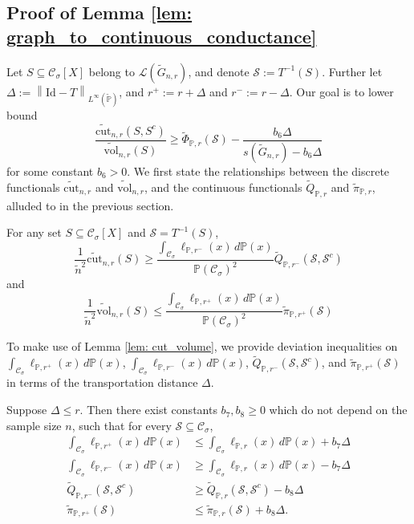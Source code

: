 \documentclass[11pt,twoside]{article}
\newcommand{\vol}{\mathrm{vol}}
\newcommand{\cut}{\mathrm{cut}}
\newcommand{\norm}[1]{\left\lVert#1\right\rVert}
\newcommand{\1}{\mathbbm{1}}
\newcommand{\Xbf}{X}
\newcommand{\Pbb}{\mathbb{P}}
\newcommand{\Sset}{\mathcal{S}}
\newcommand{\Cset}{\mathcal{C}}
\newcommand{\Csig}{\Cset_{\sigma}}
\begin{document}
\subsection{Proof of Lemma \ref{lem: graph_to_continuous_conductance}}
Let $S \subseteq \Csig[\Xbf]$ belong to $\mathcal{L}(\widetilde{G}_{n,r})$, and denote $\Sset := T^{-1}(S)$. Further let $\varDelta := \norm{\mathrm{Id} - T}_{L^{\infty}(\widetilde{\Pbb})}$, and $r^{+} := r + \varDelta$ and $r^{-} := r - \varDelta$. Our goal is to lower bound
\begin{equation*}
\frac{\widetilde{\cut}_{n,r}(S,S^c)}{\widetilde{\vol}_{n,r}(S)} \geq \widetilde{\Phi}_{\Pbb,r}(\Sset) - \frac{b_6\varDelta}{s(\widetilde{G}_{n,r}) - b_6 \varDelta}
\end{equation*}
for some constant $b_6 > 0$. We first state the relationships between the discrete functionals $\widetilde{\cut}_{n,r}$ and $\widetilde{\vol}_{n,r}$, and the continuous functionals $\widetilde{Q}_{\Pbb,r}$ and $\widetilde{\pi}_{\Pbb,r}$, alluded to in the previous section.
\begin{lemma}
	\label{lem: cut_volume}
	For any set $S \subseteq \Csig[\Xbf]$ and $\mathcal{S} = T^{-1}(S)$, 
	\begin{equation}
	\label{eqn: cut}
	\frac{1}{\widetilde{n}^2}\widetilde{\cut}_{n,r}(S) \geq \frac{\int_{\Csig} \ell_{\Pbb,r^-}(x) \,d\Pbb(x)}{\Pbb(\Csig)^2} \widetilde{Q}_{\Pbb,r^-}(\Sset, \Sset^c)
	\end{equation}
	and 
	\begin{equation}
	\label{eqn: volume}
	\frac{1}{\widetilde{n}^2}\widetilde{\vol}_{n,r}(S) \leq \frac{\int_{\Csig} \ell_{\Pbb,r^+}(x) \,d\Pbb(x)}{\Pbb(\Csig)^2} \widetilde{\pi}_{\Pbb,r^+}(\Sset)
	\end{equation}
\end{lemma}
To make use of Lemma \ref{lem: cut_volume}, we provide deviation inequalities on $\int_{\Csig} \ell_{\Pbb,r^+}(x) \,d\Pbb(x)$, $\int_{\Csig} \ell_{\Pbb,r^-}(x) \,d\Pbb(x)$, $\widetilde{Q}_{\Pbb,r^-}(\Sset, \Sset^c)$, and $\widetilde{\pi}_{\Pbb,r^+}(\Sset)$ in terms of the transportation distance $\varDelta$.
\begin{lemma}
	\label{lem: deviation_transportation_distance}
	Suppose $\Delta \leq r$. Then there exist constants $b_7,b_8 \geq 0$ which do not depend on the sample size $n$, such that for every $\Sset \subseteq \Csig$,
	\begin{align*}
	\int_{\Csig} \ell_{\Pbb,r^+}(x) \,d\Pbb(x) & \leq \int_{\Csig} \ell_{\Pbb,r}(x) \,d\Pbb(x) + b_7 \varDelta \\
	\int_{\Csig} \ell_{\Pbb,r^-}(x) \,d\Pbb(x) & \geq \int_{\Csig} \ell_{\Pbb,r}(x) \,d\Pbb(x) - b_7 \varDelta \\
	\widetilde{Q}_{\Pbb,r^-}(\Sset, \Sset^c) & \geq \widetilde{Q}_{\Pbb,r}(\Sset, \Sset^c) - b_8 \varDelta \\
	\widetilde{\pi}_{\Pbb,r^+}(\Sset) & \leq \widetilde{\pi}_{\Pbb,r}(\Sset) + b_8 \varDelta.
	\end{align*}
\end{lemma}
\end{document}
